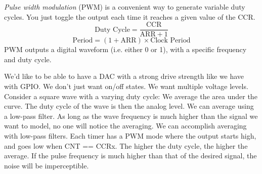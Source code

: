 \emph{Pulse width modulation} (PWM) is a convenient way to
generate variable duty cycles. You just toggle the output
each time it reaches a given value of the CCR.
\begin{equation}
    \text{Duty Cycle} = \frac{\text{CCR}}{\text{ARR} + 1}
\end{equation}
\begin{equation}
    \text{Period} = (1 + \text{ARR}) \times \text{Clock Period}
\end{equation}
PWM outputs a digital waveform (i.e. either 0 or 1),
with a specific frequency and duty cycle.

We'd like to be able to have a DAC with a strong drive
strength like we have with GPIO.
We don't just want on/off states. We want multiple voltage levels.
Consider a square wave with a varying duty cycle:
We average the area under the curve.
The duty cycle of the wave is then the analog level.
We can average using a low-pass filter.
As long as the wave frequency is much higher than
the signal we want to model, no one will notice
the averaging. We can accomplish averaging with low-pass filters.
Each timer has a PWM mode where the output starts high, and goes low
when CNT == CCRx. The higher the duty cycle, the higher the average.
If the pulse frequency is much higher than that of the
desired signal, the noise will be imperceptible.